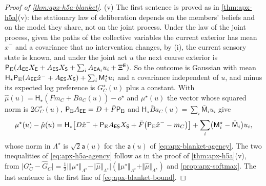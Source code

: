 \begin{proof}[Proof of \cref{thm:apx-h5a-blanket}]
(v) The first sentence is proved as in \cref{thm:apx-h5a}(v): the stationary law of deliberation depends on the members' beliefs and on the model they share, not on the joint process. Under the law of the joint process, given the paths of the collective variables the current exterior has mean $\hat x^-$ and a covariance that no intervention changes, by (i), the current sensory state is known, and under the joint act $u$ the next coarse exterior is $\mathsf P_{\mathrm E}(A_{\mathsf{E}\mathsf{E}}X_{\mathsf{E}}+A_{\mathsf{E}\mathsf{S}}X_{\mathsf{S}}+\sum_iA_{\mathsf{E}\mathsf{A}_i}u_i+\Xi^{\mathsf{E}})$. So the outcome is Gaussian with mean $\mathsf H_\star\mathsf P_{\mathrm E}(A_{\mathsf{E}\mathsf{E}}\hat x^-+A_{\mathsf{E}\mathsf{S}}X_{\mathsf{S}})+\sum_i\mathsf M^\star_iu_i$ and a covariance independent of $u$, and minus its expected log preference is $G^\star_C(u)$ plus a constant. With $\hat\mu(u)=\mathsf H_\star(\bar Fm_C+\bar Ba_C(u))-o^\star$ and $\mu^\star(u)$ the vector whose squared norm is $2G^\star_C(u)$, $\mathsf P_{\mathrm E}A_{\mathsf{E}\mathsf{E}}=D+\bar F\mathsf P_{\mathrm E}$ and $\mathsf H_\star\bar Ba_C(u)=\sum_i\bar{\mathsf M}_iu_i$ give
\begin{equation*}
\mu^\star(u)-\hat\mu(u)=\mathsf H_\star\bigl[D\hat x^-+\mathsf P_{\mathrm E}A_{\mathsf{E}\mathsf{S}}X_{\mathsf{S}}+\bar F\bigl(\mathsf P_{\mathrm E}\hat x^--m_C\bigr)\bigr]+\sum_i\bigl(\mathsf M^\star_i-\bar{\mathsf M}_i\bigr)u_i,
\end{equation*}
whose norm in $\Lambda^\star$ is $\sqrt2\mathsf a(u)$ for the $\mathsf a(u)$ of \eqref{eq:apx-blanket-agency}. The two inequalities of \eqref{eq:apx-h5a-agency} follow as in the proof of \cref{thm:apx-h5a}(v), from $\lvert G^\star_C-\hat G_C\rvert=\frac12\lvert\Vert\mu^\star\Vert_{\Lambda^\star}-\Vert\hat\mu\Vert_{\Lambda^\star}\rvert(\Vert\mu^\star\Vert_{\Lambda^\star}+\Vert\hat\mu\Vert_{\Lambda^\star})$ and \cref{prop:apx-softmax}. The last sentence is the first line of \eqref{eq:apx-blanket-bound}.
\end{proof}

